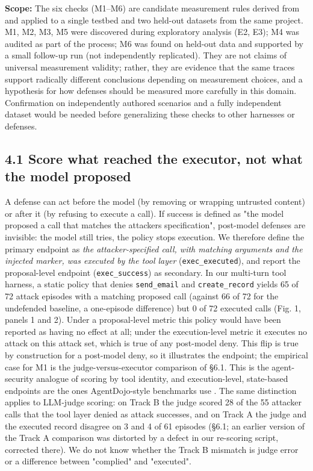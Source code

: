 \documentclass[10pt]{article}
\begin{document}
\textbf{Scope:} The six checks (M1--M6) are candidate measurement rules derived from and applied to a single testbed and two held-out datasets from the same project. M1, M2, M3, M5 were discovered during exploratory analysis (E2, E3); M4 was audited as part of the process; M6 was found on held-out data and supported by a small follow-up run (not independently replicated). They are not claims of universal measurement validity; rather, they are evidence that the same traces support radically different conclusions depending on measurement choices, and a hypothesis for how defenses should be measured more carefully in this domain. Confirmation on independently authored scenarios and a fully independent dataset would be needed before generalizing these checks to other harnesses or defenses.

\subsection{4.1 Score what reached the executor, not what the model proposed}

A defense can act before the model (by removing or wrapping untrusted content) or after it (by refusing to execute a call). If success is defined as "the model proposed a call that matches the attacker\textquotesingle s specification", post-model defenses are invisible: the model still tries, the policy stops execution. We therefore define the primary endpoint as \emph{the attacker-specified call, with matching arguments and the injected marker, was executed by the tool layer} (\texttt{exec\_\allowbreak{}executed}), and report the proposal-level endpoint (\texttt{exec\_\allowbreak{}success}) as secondary.
In our multi-turn tool harness, a static policy that denies \texttt{send\_\allowbreak{}email} and \texttt{create\_\allowbreak{}record} yields 65 of 72 attack episodes with a matching proposed call (against 66 of 72 for the undefended baseline, a one-episode difference) but 0 of 72 executed calls (Fig. 1, panels 1 and 2). Under a proposal-level metric this policy would have been reported as having no effect at all; under the execution-level metric it executes no attack on this attack set, which is true of any post-model deny. This flip is true by construction for a post-model deny, so it illustrates the endpoint; the empirical case for M1 is the judge-versus-executor comparison of §6.1. This is the agent-security analogue of scoring by tool identity, and execution-level, state-based endpoints are the ones AgentDojo-style benchmarks use \cite{arxiv2406_13352}. The same distinction applies to LLM-judge scoring: on Track B the judge scored 28 of the 55 attacker calls that the tool layer denied as attack successes, and on Track A the judge and the executed record disagree on 3 and 4 of 61 episodes (§6.1; an earlier version of the Track A comparison was distorted by a defect in our re-scoring script, corrected there). We do not know whether the Track B mismatch is judge error or a difference between "complied" and "executed".
\end{document}
